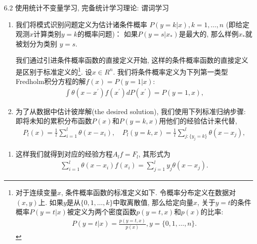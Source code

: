 \documentclass[compress,10pt,dvipsnames,notheorems]{beamer} %
\begin{document}
\begin{frame}{6.2 使用统计不变量学习, 完备统计学习理论: 谓词学习}
\begin{enumerate}
\item 我们将模式识别问题定义为估计诸条件概率 $P(y = k|x), k = 1,\ldots,n$ (即给定观测$x$计算类别$y=k$的概率问题)： 如果$P(y = s|x_{*})$是最大的, 那么样例$x_{*}$就被划分为类别 $y = s$. 

我们通过引进条件概率函数的直接定义开始, 这样的条件概率函数的直接定义是区别于标准定义的\footnote{对于连续变量$x$, 条件概率函数的标准定义如下. 令概率分布定义在数据对$(x,y)$上. 如果$y$是从$\{0,1,\ldots,k\}$中取离散值, 那么给定向量$x$, 关于$y=t$的条件概率$P(y=t|x)$被定义为两个密度函数$p(y=t,x)$和$p(x)$的比率:
\begin{align*}
P(y=t | x) = \frac{p(y=t,x)}{p(x)}, y = \{0,1,\ldots,n\}.
\end{align*}}.
设$x \in R^{n}$. 我们将条件概率定义为下列第一类型Fredholm积分方程的解$f(x) = P(y=1 | x)$:
\begin{align}\label{ml1}
\int \theta(x - x^{\prime})f(x^{\prime})dP(x^{\prime}) = P(y=1, x),
\end{align}
\item 为了从数据中估计彼岸解(the desired solution), 我们使用下列标准归纳步骤: 即将未知的累积分布函数$P(x)$和$P(y=k,x)$用他们的经验估计来代替,
\begin{align*}
P_{l}(x) = \frac{1}{l}\sum_{i=1}^{l}\theta(x-x_{i}), \quad P_{l}(y=k,x) = \frac{1}{l}\sum_{j:\{y_{j}=k\}}^{l}\theta(x-x_{j}),
\end{align*}
\end{enumerate}
\end{frame}

\begin{frame}
\begin{enumerate}
\item 这样我们就得到对应的经验方程$A_{l}f = F_{l}$, 其形式为
\begin{align*}
\sum_{i=1}^{l}\theta(x-x_{i})f(x_{i}) = \sum_{j=1}^{l}y_{j}\theta(x-x_{j}).
\end{align*}
\end{enumerate}
\end{frame}
\end{document}
